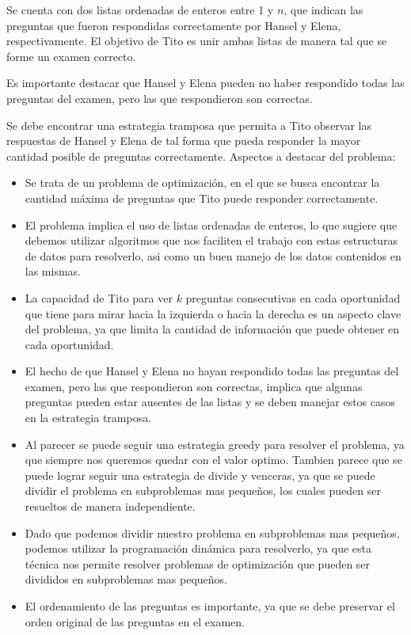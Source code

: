 \documentclass[a4paper, 12pt]{article}
\begin{document}
Se cuenta con dos listas ordenadas de enteros entre 1 y $n$, que indican las preguntas que fueron respondidas correctamente por Hansel y Elena, respectivamente. El objetivo de Tito es unir ambas listas de manera tal que se forme un examen correcto. 

Es importante destacar que Hansel y Elena pueden no haber respondido todas las preguntas del examen, pero las que respondieron son correctas. 

Se debe encontrar una estrategia tramposa que permita a Tito observar las respuestas de Hansel y Elena de tal forma que pueda responder la mayor cantidad posible de preguntas correctamente.
Aspectos a destacar del problema:
\begin{itemize}
\item Se trata de un problema de optimización, en el que se busca encontrar la cantidad máxima de preguntas que Tito puede responder correctamente.

\item El problema implica el uso de listas ordenadas de enteros, lo que sugiere que debemos utilizar algoritmos que nos faciliten el trabajo con estas estructuras de datos para resolverlo, asi como un buen manejo de los datos contenidos en las mismas.

\item La capacidad de Tito para ver $k$ preguntas consecutivas en cada oportunidad que tiene para mirar hacia la izquierda o hacia la derecha es un aspecto clave del problema, ya que limita la cantidad de información que puede obtener en cada oportunidad.

\item El hecho de que Hansel y Elena no hayan respondido todas las preguntas del examen, pero las que respondieron son correctas, implica que algunas preguntas pueden estar ausentes de las listas y se deben manejar estos casos en la estrategia tramposa.

\item Al parecer se puede seguir una estrategia greedy para resolver el problema, ya que siempre nos queremos quedar con el valor optimo. Tambien parece que se puede lograr seguir una estrategia de divide y venceras, ya que se puede dividir el problema en subproblemas mas pequeños, los cuales pueden ser resueltos de manera independiente.

\item Dado que podemos dividir nuestro problema en subproblemas mas pequeños, podemos utilizar la programación dinámica para resolverlo, ya que esta técnica nos permite resolver problemas de optimización que pueden ser divididos en subproblemas mas pequeños.

\item El ordenamiento de las preguntas es importante, ya que se debe preservar el orden original de las preguntas en el examen.
\end{itemize}
\end{document}
